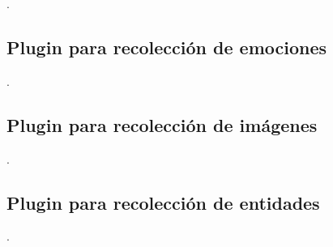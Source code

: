 .


\subsection{Plugin para recolección de emociones}

.



\subsection{Plugin para recolección de imágenes}

\lstset{style=/Style/ROS/MSG}


.


\subsection{Plugin para recolección de entidades}

.



